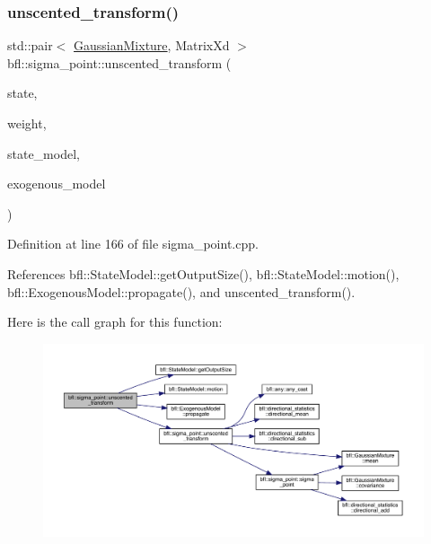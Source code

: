 \subsubsection{\texorpdfstring{unscented\+\_\+transform()}{unscented\_transform()}\hspace{0.1cm}{\footnotesize\ttfamily [3/8]}}
{\footnotesize\ttfamily std\+::pair$<$ \mbox{\hyperlink{classbfl_1_1GaussianMixture}{Gaussian\+Mixture}}, Matrix\+Xd $>$ bfl\+::sigma\+\_\+point\+::unscented\+\_\+transform (\begin{DoxyParamCaption}\item[{const \mbox{\hyperlink{classbfl_1_1GaussianMixture}{Gaussian\+Mixture}} \&}]{state,  }\item[{const \mbox{\hyperlink{structbfl_1_1sigma__point_1_1UTWeight}{U\+T\+Weight}} \&}]{weight,  }\item[{\mbox{\hyperlink{classbfl_1_1StateModel}{State\+Model}} \&}]{state\+\_\+model,  }\item[{\mbox{\hyperlink{classbfl_1_1ExogenousModel}{Exogenous\+Model}} \&}]{exogenous\+\_\+model }\end{DoxyParamCaption})}



Definition at line 166 of file sigma\+\_\+point.\+cpp.



References bfl\+::\+State\+Model\+::get\+Output\+Size(), bfl\+::\+State\+Model\+::motion(), bfl\+::\+Exogenous\+Model\+::propagate(), and unscented\+\_\+transform().

Here is the call graph for this function\+:
\nopagebreak
\begin{figure}[H]
\begin{center}
\leavevmode
\includegraphics[width=350pt]{namespacebfl_1_1sigma__point_a9b4d661460ac0ad28493ae144a6ccee4_cgraph}
\end{center}
\end{figure}
\mbox{\label{namespacebfl_1_1sigma__point_ab1a8018531dbd8a28c08dd3418d1976d}} 
